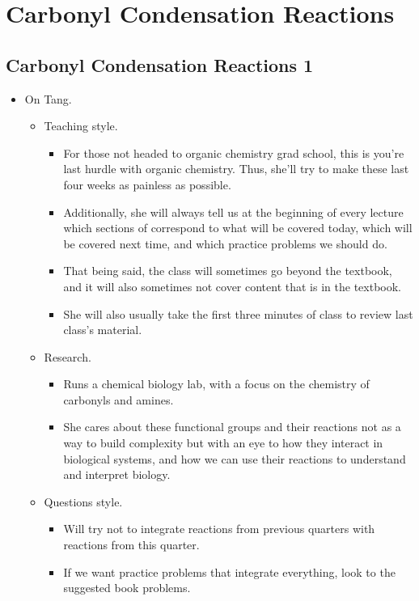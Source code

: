 \documentclass[../notes.tex]{subfiles}
\begin{document}
\chapter{Carbonyl Condensation Reactions}
\section{Carbonyl Condensation Reactions 1}
\begin{itemize}
    \item {}On Tang.
    \begin{itemize}
        \item Teaching style.
        \begin{itemize}
            \item For those not headed to organic chemistry grad school, this is you're last hurdle with organic chemistry. Thus, she'll try to make these last four weeks as painless as possible.
            \item Additionally, she will always tell us at the beginning of every lecture which sections of \textcite{bib:SolomonsEtAl} correspond to what will be covered today, which will be covered next time, and which practice problems we should do.
            \item That being said, the class will sometimes go beyond the textbook, and it will also sometimes not cover content that is in the textbook.
            \item She will also usually take the first three minutes of class to review last class's material.
        \end{itemize}
        \item Research.
        \begin{itemize}
            \item Runs a chemical biology lab, with a focus on the chemistry of carbonyls and amines.
            \item She cares about these functional groups and their reactions not as a way to build complexity but with an eye to how they interact in biological systems, and how we can use their reactions to understand and interpret biology.
        \end{itemize}
        \item Questions style.
        \begin{itemize}
            \item Will try not to integrate reactions from previous quarters with reactions from this quarter.
            \item If we want practice problems that integrate everything, look to the suggested book problems.

\end{itemize}
\end{itemize}
\end{itemize}
\end{document}
